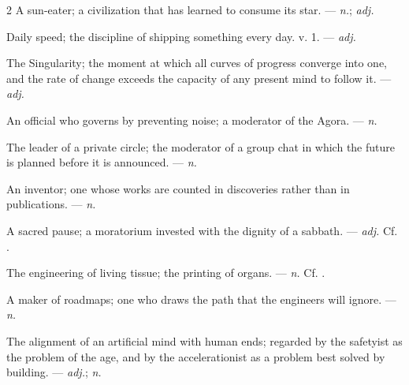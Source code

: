 \begin{multicols}{2}
 A sun-eater; a civilization that has learned to consume its star. —  \textit{n.};  \textit{adj.}

 Daily speed; the discipline of shipping something every day.   v. 1. —  \textit{adj.}

 The Singularity; the moment at which all curves of progress converge into one, and the rate of change exceeds the capacity of any present mind to follow it. —  \textit{adj.}

 An official who governs by preventing noise; a moderator of the Agora. —  \textit{n.}

 The leader of a private circle; the moderator of a group chat in which the future is planned before it is announced. —  \textit{n.}

 An inventor; one whose works are counted in discoveries rather than in publications. —  \textit{n.}

 A sacred pause; a moratorium invested with the dignity of a sabbath.   —  \textit{adj.} Cf. .

 The engineering of living tissue; the printing of organs. —  \textit{n.} Cf. .

 A maker of roadmaps; one who draws the path that the engineers will ignore.  —  \textit{n.}

 The alignment of an artificial mind with human ends; regarded by the safetyist as the problem of the age, and by the accelerationist as a problem best solved by building. —  \textit{adj.};  \textit{n.}


\end{multicols}
